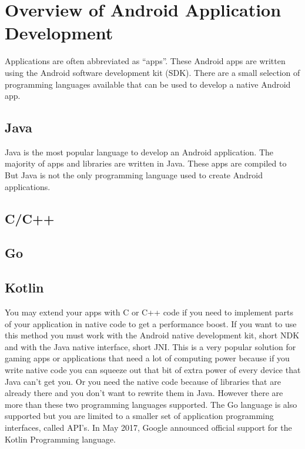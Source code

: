 \section{Overview of Android Application Development}
 Applications are often abbreviated as ``apps''. These Android apps are written using the Android software development kit (SDK). There are a small selection of programming languages available that can be used to develop a native Android app.

\subsection{Java}
Java is the most popular language to develop an Android application. The majority of apps and libraries are written in Java. These apps are compiled to
But Java is not the only programming language used to create Android applications.
\subsection{C/C++}

\subsection{Go}

\subsection{Kotlin}
You may extend your apps with C or C++ code if you need to implement parts of your application in native code to get a performance boost. If you want to use this method you must work with the Android native development kit, short NDK and with the Java native interface, short JNI.  This is a very popular solution for gaming apps or applications that need a lot of computing power because if you write native code you can squeeze out that bit of extra power of every device that Java can't get you. Or you need the native code because of libraries that are already there and you don't want to rewrite them in Java. However there are more than these two programming languages supported. The Go language is also supported but you are limited to a smaller set of application programming interfaces, called API's. In May 2017, Google announced official support for the Kotlin Programming language.
